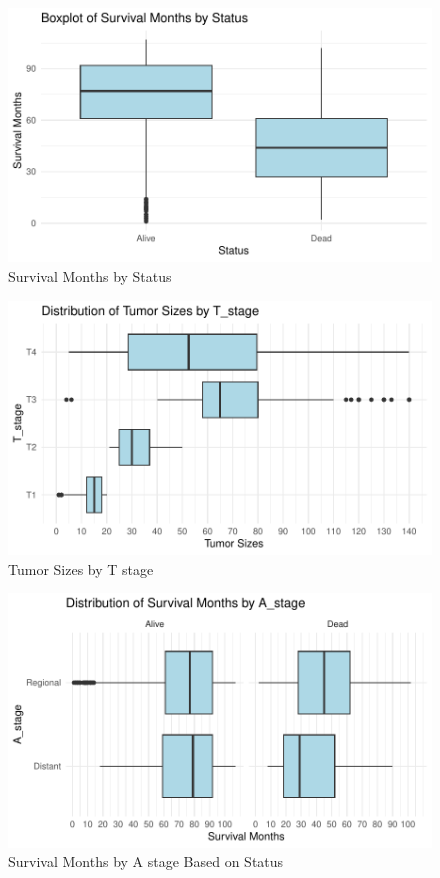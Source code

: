 \documentclass[
]{article}
\begin{document}
\begin{figure}
\includegraphics[width=0.9\linewidth]{P8130_project_report_files/figure-latex/survival_months_by_status-1} \caption{Survival Months by Status}\label{fig:survival_months_by_status}
\end{figure}

\begin{figure}
\includegraphics[width=0.9\linewidth]{P8130_project_report_files/figure-latex/tumor_sizes_by_t_stage-1} \caption{Tumor Sizes by T stage}\label{fig:tumor_sizes_by_t_stage}
\end{figure}

\begin{figure}
\includegraphics[width=0.9\linewidth]{P8130_project_report_files/figure-latex/survival_months_by_a_stage_based_on_status-1} \caption{Survival Months by A stage Based on Status}\label{fig:survival_months_by_a_stage_based_on_status}
\end{figure}
\end{document}
